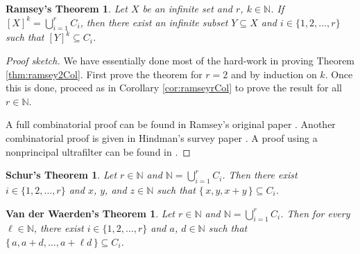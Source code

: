 \documentclass[12pt]{article}
\theoremstyle{plain}
\newtheorem*{ramsey}{Ramsey's Theorem}
\newtheorem*{vdw}{Van der Waerden's Theorem}
\newtheorem*{schur}{Schur's Theorem}
\theoremstyle{definition}
\newcommand{\bbN}{\mathbb{N}}
\begin{document}
\begin{ramsey}
  Let $X$ be an infinite set and $r$, $k \in \bbN$.
  If $[X]^k = \bigcup_{i=1}^r C_i$, then there exist an infinite subset
  $Y \subseteq X$ and $i \in \{1, 2, \ldots, r\}$ such that $[Y]^k
  \subseteq C_i$.
\end{ramsey}
\begin{proof}[Proof sketch]
  We have essentially done most of the hard-work in proving Theorem
  \ref{thm:ramsey2Col}. 
  First prove the theorem for $r = 2$ and by induction on $k$.
  Once this is done, proceed as in Corollary \ref{cor:ramseyrCol} to
  prove the result for all $r \in \bbN$.

  A full combinatorial proof can be found in Ramsey's original paper
  \cite[Theorem A]{Ramsey:1930uq}. Another combinatorial proof is
  given in Hindman's survey paper \cite[Theorem ??]{Hindman:1979fk}.
  A proof using a nonprincipal ultrafilter can be found in
  \cite[Theorem 18.2]{Hindman:1998fk}.
\end{proof}

\begin{schur}
  Let $r \in \bbN$ and $\bbN = \bigcup_{i=1}^r C_i$.
  Then there exist $i \in \{1, 2, \ldots, r\}$ and $x$, $y$, and $z
  \in \bbN$ such that $\{\, x, y, x+y \,\} \subseteq C_i$.
\end{schur}

\begin{vdw}
  Let $r \in \bbN$ and $\bbN = \bigcup_{i=1}^r C_i$.
  Then for every $\ell \in \bbN$, there exist $i \in \{1, 2, \ldots,
  r\}$ and $a$, $d \in \bbN$ such that $\{\, a, a+d, \ldots, a+\ell d
  \,\} \subseteq C_i$.
\end{vdw}



\end{document}
